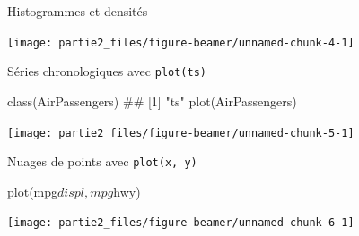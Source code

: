 \documentclass[12pt,ignorenonframetext,]{beamer}
\newenvironment{Shaded}{}{}
\newcommand{\DataTypeTok}[1]{#1}
\newcommand{\FloatTok}[1]{#1}
\newcommand{\KeywordTok}[1]{\textcolor[rgb]{0.00,0.00,1.00}{#1}}
\newcommand{\NormalTok}[1]{#1}
\newcommand{\OperatorTok}[1]{#1}
\newcommand{\StringTok}[1]{\textcolor[rgb]{0.00,0.50,0.50}{#1}}
\renewenvironment{Shaded}{\begin{snugshade}}{\end{snugshade}}
\begin{document}
\begin{frame}[fragile]{Histogrammes et densités}
\protect\hypertarget{histogrammes-et-densites-2}{}

\centering \footnotesize

\begin{Shaded}
\end{Shaded}

\texttt{[image: partie2\_files/figure-beamer/unnamed-chunk-4-1]}

\end{frame}

\begin{frame}[fragile]{Séries chronologiques avec \texttt{plot(ts)}}
\protect\hypertarget{series-chronologiques-avec-plotts}{}

\centering \footnotesize

\begin{Shaded}
\begin{Highlighting}[]
\KeywordTok{class}\NormalTok{(AirPassengers)}
\NormalTok{  ## [1] "ts"}
\KeywordTok{plot}\NormalTok{(AirPassengers)}
\end{Highlighting}
\end{Shaded}

\texttt{[image: partie2\_files/figure-beamer/unnamed-chunk-5-1]}

\end{frame}

\begin{frame}[fragile]{Nuages de points avec \texttt{plot(x,\ y)}}
\protect\hypertarget{nuages-de-points-avec-plotx-y}{}

\centering \footnotesize

\begin{Shaded}
\begin{Highlighting}[]
\KeywordTok{plot}\NormalTok{(mpg}\OperatorTok{$}\NormalTok{displ, mpg}\OperatorTok{$}\NormalTok{hwy)}
\end{Highlighting}
\end{Shaded}

\texttt{[image: partie2\_files/figure-beamer/unnamed-chunk-6-1]}

\end{frame}
\end{document}
